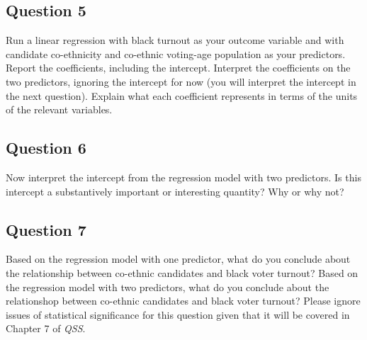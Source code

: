 \documentclass[]{article}
\begin{document}
\subsection{Question 5}\label{question-5}

Run a linear regression with black turnout as your outcome variable and
with candidate co-ethnicity and co-ethnic voting-age population as your
predictors. Report the coefficients, including the intercept. Interpret
the coefficients on the two predictors, ignoring the intercept for now
(you will interpret the intercept in the next question). Explain what
each coefficient represents in terms of the units of the relevant
variables.

\subsection{Question 6}\label{question-6}

Now interpret the intercept from the regression model with two
predictors. Is this intercept a substantively important or interesting
quantity? Why or why not?

\subsection{Question 7}\label{question-7}

Based on the regression model with one predictor, what do you conclude
about the relationship between co-ethnic candidates and black voter
turnout? Based on the regression model with two predictors, what do you
conclude about the relationshop between co-ethnic candidates and black
voter turnout? Please ignore issues of statistical significance for this
question given that it will be covered in Chapter 7 of \emph{QSS}.
\end{document}
